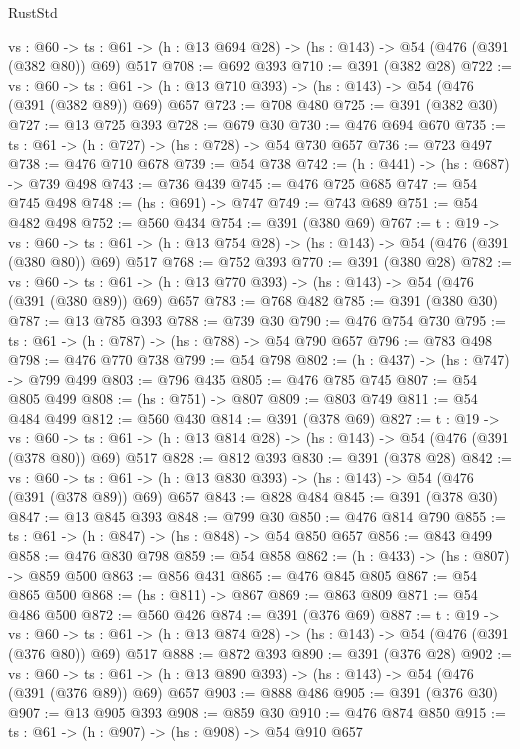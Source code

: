\begin{lexlean}{RustStd}
\begin{coremodule}
  {vs : @60} ->
  {ts : @61} -> (h : @13 @694 @28) -> (hs : @143) -> @54 (@476 (@391 (@382 @80)) @69) @517
@708 := @692 @393
@710 := @391 (@382 @28)
@722 := {vs : @60} ->
  {ts : @61} -> (h : @13 @710 @393) -> (hs : @143) -> @54 (@476 (@391 (@382 @89)) @69) @657
@723 := @708 @480
@725 := @391 (@382 @30)
@727 := @13 @725 @393
@728 := @679 @30
@730 := @476 @694 @670
@735 := {ts : @61} -> (h : @727) -> (hs : @728) -> @54 @730 @657
@736 := @723 @497
@738 := @476 @710 @678
@739 := @54 @738
@742 := (h : @441) -> (hs : @687) -> @739 @498
@743 := @736 @439
@745 := @476 @725 @685
@747 := @54 @745 @498
@748 := (hs : @691) -> @747
@749 := @743 @689
@751 := @54 @482 @498
@752 := @560 @434
@754 := @391 (@380 @69)
@767 := {t : @19} ->
  {vs : @60} ->
  {ts : @61} -> (h : @13 @754 @28) -> (hs : @143) -> @54 (@476 (@391 (@380 @80)) @69) @517
@768 := @752 @393
@770 := @391 (@380 @28)
@782 := {vs : @60} ->
  {ts : @61} -> (h : @13 @770 @393) -> (hs : @143) -> @54 (@476 (@391 (@380 @89)) @69) @657
@783 := @768 @482
@785 := @391 (@380 @30)
@787 := @13 @785 @393
@788 := @739 @30
@790 := @476 @754 @730
@795 := {ts : @61} -> (h : @787) -> (hs : @788) -> @54 @790 @657
@796 := @783 @498
@798 := @476 @770 @738
@799 := @54 @798
@802 := (h : @437) -> (hs : @747) -> @799 @499
@803 := @796 @435
@805 := @476 @785 @745
@807 := @54 @805 @499
@808 := (hs : @751) -> @807
@809 := @803 @749
@811 := @54 @484 @499
@812 := @560 @430
@814 := @391 (@378 @69)
@827 := {t : @19} ->
  {vs : @60} ->
  {ts : @61} -> (h : @13 @814 @28) -> (hs : @143) -> @54 (@476 (@391 (@378 @80)) @69) @517
@828 := @812 @393
@830 := @391 (@378 @28)
@842 := {vs : @60} ->
  {ts : @61} -> (h : @13 @830 @393) -> (hs : @143) -> @54 (@476 (@391 (@378 @89)) @69) @657
@843 := @828 @484
@845 := @391 (@378 @30)
@847 := @13 @845 @393
@848 := @799 @30
@850 := @476 @814 @790
@855 := {ts : @61} -> (h : @847) -> (hs : @848) -> @54 @850 @657
@856 := @843 @499
@858 := @476 @830 @798
@859 := @54 @858
@862 := (h : @433) -> (hs : @807) -> @859 @500
@863 := @856 @431
@865 := @476 @845 @805
@867 := @54 @865 @500
@868 := (hs : @811) -> @867
@869 := @863 @809
@871 := @54 @486 @500
@872 := @560 @426
@874 := @391 (@376 @69)
@887 := {t : @19} ->
  {vs : @60} ->
  {ts : @61} -> (h : @13 @874 @28) -> (hs : @143) -> @54 (@476 (@391 (@376 @80)) @69) @517
@888 := @872 @393
@890 := @391 (@376 @28)
@902 := {vs : @60} ->
  {ts : @61} -> (h : @13 @890 @393) -> (hs : @143) -> @54 (@476 (@391 (@376 @89)) @69) @657
@903 := @888 @486
@905 := @391 (@376 @30)
@907 := @13 @905 @393
@908 := @859 @30
@910 := @476 @874 @850
@915 := {ts : @61} -> (h : @907) -> (hs : @908) -> @54 @910 @657

\end{coremodule}
\end{lexlean}

